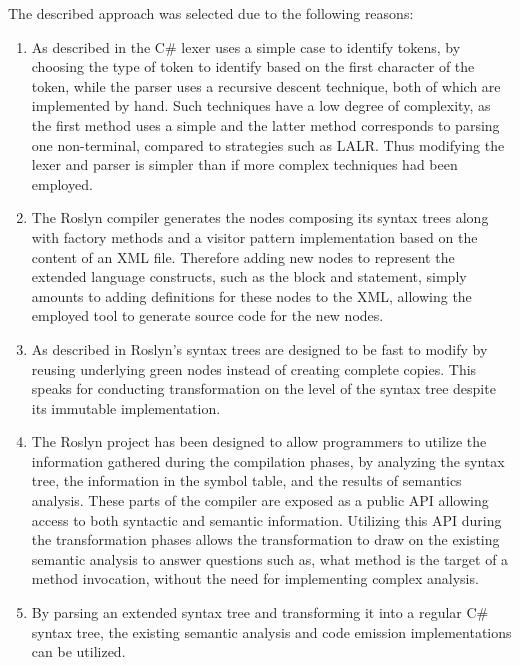 The described approach was selected due to the following reasons:
\begin{enumerate}
\item As described in  the C\# lexer uses a simple  case to identify tokens, by choosing the type of token to identify based on the first character of the token, while the parser uses a recursive descent technique, both of which are implemented by hand. Such techniques have a low degree of complexity, as the first method uses a simple  and the latter method corresponds to parsing one non-terminal, compared to strategies such as \ac{LALR}\cite{nunes2003cps}. Thus modifying the lexer and parser is simpler than if more complex techniques had been employed.

\item The Roslyn compiler generates the nodes composing its syntax trees along with factory methods and a visitor pattern implementation based on the content of an \ac{XML} file. Therefore adding new nodes to represent the extended language constructs, such as the  block and  statement, simply amounts to adding definitions for these nodes to the \ac{XML}, allowing the employed tool to generate source code for the new nodes. 

\item As described in  Roslyn's syntax trees are designed to be fast to modify by reusing underlying green nodes instead of creating complete copies\cite[p. 6]{ng2012roslyn}. This speaks for conducting transformation on the level of the syntax tree despite its immutable implementation.

\item The Roslyn project has been designed to allow programmers to utilize the information gathered during the compilation phases, by analyzing the syntax tree, the information in the symbol table, and the results of semantics analysis. These parts of the compiler are exposed as a public \ac{API} allowing access to both syntactic and semantic information. Utilizing this \ac{API} during the transformation phases allows the transformation to draw on the existing semantic analysis to answer questions such as, what method is the target of a method invocation, without the need for implementing complex analysis.

\item By parsing an extended syntax tree and transforming it into a regular C\# syntax tree, the existing semantic analysis and code emission implementations can be utilized.
\end{enumerate}

